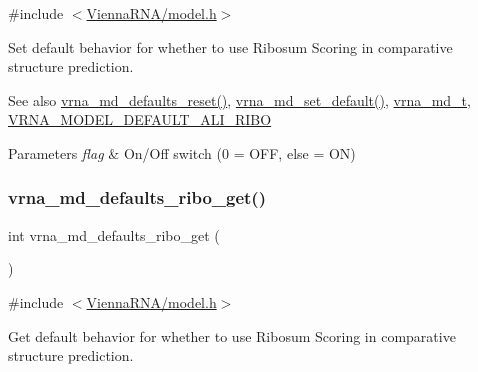 {\ttfamily \#include $<$\mbox{\hyperlink{model_8h}{Vienna\+R\+N\+A/model.\+h}}$>$}



Set default behavior for whether to use Ribosum Scoring in comparative structure prediction. 

\begin{DoxySeeAlso}{See also}
\mbox{\hyperlink{group__model__details_ga70834424cf804d149937de89f80ceb45}{vrna\+\_\+md\+\_\+defaults\+\_\+reset()}}, \mbox{\hyperlink{group__model__details_ga8ac6ff84936282436f822644bf841f66}{vrna\+\_\+md\+\_\+set\+\_\+default()}}, \mbox{\hyperlink{group__model__details_ga1f8a10e12a0a1915f2a4eff0b28ea17c}{vrna\+\_\+md\+\_\+t}}, \mbox{\hyperlink{group__model__details_ga64b3ab65a9ca42d4ad1d05e193083147}{V\+R\+N\+A\+\_\+\+M\+O\+D\+E\+L\+\_\+\+D\+E\+F\+A\+U\+L\+T\+\_\+\+A\+L\+I\+\_\+\+R\+I\+BO}} 
\end{DoxySeeAlso}

\begin{DoxyParams}{Parameters}
{\em flag} & On/\+Off switch (0 = O\+FF, else = ON) \\
\hline
\end{DoxyParams}
\mbox{\label{group__model__details_ga169027f0c0561ea7d87b655e4b336bfc}} 
\subsubsection{\texorpdfstring{vrna\+\_\+md\+\_\+defaults\+\_\+ribo\+\_\+get()}{vrna\_md\_defaults\_ribo\_get()}}
{\footnotesize\ttfamily int vrna\+\_\+md\+\_\+defaults\+\_\+ribo\+\_\+get (\begin{DoxyParamCaption}\item[{void}]{ }\end{DoxyParamCaption})}



{\ttfamily \#include $<$\mbox{\hyperlink{model_8h}{Vienna\+R\+N\+A/model.\+h}}$>$}



Get default behavior for whether to use Ribosum Scoring in comparative structure prediction. 

